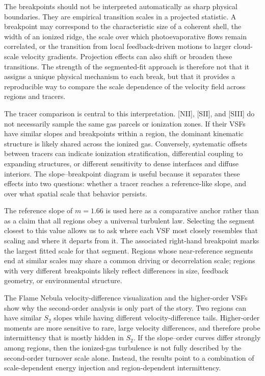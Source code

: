 The breakpoints should not be interpreted automatically as sharp physical
boundaries. They are empirical transition scales in a projected statistic. A
breakpoint may correspond to the characteristic size of a coherent shell, the
width of an ionized ridge, the scale over which photoevaporative flows remain
correlated, or the transition from local feedback-driven motions to larger
cloud-scale velocity gradients. Projection effects can also shift or broaden
these transitions. The strength of the segmented-fit approach is therefore not
that it assigns a unique physical mechanism to each break, but that it provides
a reproducible way to compare the scale dependence of the velocity field across
regions and tracers.

The tracer comparison is central to this interpretation. [NII], [SII], and
[SIII] do not necessarily sample the same gas parcels or ionization zones.
If their VSFs have similar slopes and breakpoints within a region, the dominant
kinematic structure is likely shared across the ionized gas. Conversely,
systematic offsets between tracers can indicate ionization stratification,
differential coupling to expanding structures, or different sensitivity to
dense interfaces and diffuse interiors. The slope--breakpoint diagram is useful
because it separates these effects into two questions: whether a tracer reaches
a reference-like slope, and over what spatial scale that behavior persists.

The reference slope of $m=1.66$ is used here as a comparative anchor rather
than as a claim that all regions obey a universal turbulent law. Selecting the
segment closest to this value allows us to ask where each VSF most closely
resembles that scaling and where it departs from it. The associated right-hand
breakpoint marks the largest fitted scale for that segment. Regions whose
near-reference segments end at similar scales may share a common driving or
decorrelation scale; regions with very different breakpoints likely reflect
differences in size, feedback geometry, or environmental structure.

The Flame Nebula velocity-difference visualization and the higher-order VSFs
show why the second-order analysis is only part of the story. Two regions can
have similar $S_2$ slopes while having different velocity-difference tails.
Higher-order moments are more sensitive to rare, large velocity differences,
and therefore probe intermittency that is mostly hidden in $S_2$. If the
slope--order curves differ strongly among regions, then the ionized-gas
turbulence is not fully described by the second-order turnover scale alone.
Instead, the results point to a combination of scale-dependent energy injection
and region-dependent intermittency.

